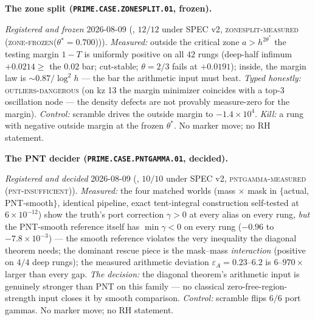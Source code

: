 \documentclass[11pt,a4paper]{article}
\begin{document}
\par\smallskip\noindent\textbf{The zone split
(\texttt{PRIME.CASE.\allowbreak ZONESPLIT.01}, frozen).}
{\sloppy
\emph{Registered and frozen} 2026-08-09
(, $12/12$ under SPEC v2,
\textsc{zonesplit-measured (zone-frozen($\theta^{*} = 0.700$))}).
\emph{Measured:} outside the critical zone $a > h^{2\theta^*}$
the testing margin $1 - T$ is uniformly positive on all $42$
rungs (deep-half infimum $+0.0214 \ge$ the $0.02$ bar;
cut-stable; $\theta = 2/3$ fails at $+0.0191$); inside, the
margin law is ${\sim}0.87/\log^{2} h$ --- the bar the
arithmetic input must beat.  \emph{Typed honestly:}
\textsc{outliers-dangerous} (on kz 13 the margin minimizer
coincides with a top-3 oscillation node --- the density defects
are not provably measure-zero for the margin).  \emph{Control:}
scramble drives the outside margin to $-1.4\times10^{4}$.
\emph{Kill:} a rung with negative outside margin at the frozen
$\theta^{*}$.  No marker move; no RH statement.\par}

\par\smallskip\noindent\textbf{The PNT decider
(\texttt{PRIME.CASE.\allowbreak PNTGAMMA.01}, decided).}
{\sloppy
\emph{Registered and decided} 2026-08-09
(, $10/10$ under SPEC v2,
\textsc{pntgamma-measured (pnt-insufficient)}).
\emph{Measured:} the four matched worlds (mass $\times$ mask in
$\{$actual, PNT-smooth$\}$, identical pipeline, exact
tent-integral construction self-tested at $6\times10^{-12}$)
show the truth's port correction $\gamma > 0$ at every alias on
every rung, \emph{but} the PNT-smooth reference itself has
$\min\gamma < 0$ on every rung ($-0.96$ to
$-7.8\times10^{-3}$) --- the smooth reference violates the very
inequality the diagonal theorem needs; the dominant rescue
piece is the mask--mass \emph{interaction} (positive on $4/4$
deep rungs); the measured arithmetic deviation $\varepsilon_A =
0.23$--$6.2$ is $6$--$970\times$ larger than every gap.
\emph{The decision:} the diagonal theorem's arithmetic input is
genuinely stronger than PNT on this family --- no classical
zero-free-region-strength input closes it by smooth comparison.
\emph{Control:} scramble flips $6/6$ port gammas.  No marker
move; no RH statement.\par}
\end{document}
